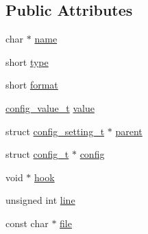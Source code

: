 \subsection*{Public Attributes}
\begin{DoxyCompactItemize}
\item 
char $\ast$ \hyperlink{structconfig__setting__t_a2228af4451498a4961b72dd4dcfe57cb}{name}
\item 
short \hyperlink{structconfig__setting__t_aab8065083de2436448b7b99b46feff18}{type}
\item 
short \hyperlink{structconfig__setting__t_a8957b2dcbf59fcfd00a3abe41bd0d7b5}{format}
\item 
\hyperlink{unionconfig__value__t}{config\_\-value\_\-t} \hyperlink{structconfig__setting__t_a2d217386c7e30456e484151b61ce597f}{value}
\item 
struct \hyperlink{structconfig__setting__t}{config\_\-setting\_\-t} $\ast$ \hyperlink{structconfig__setting__t_a70368ebbbb3c902adbbcd96606547d7d}{parent}
\item 
struct \hyperlink{structconfig__t}{config\_\-t} $\ast$ \hyperlink{structconfig__setting__t_a8d6d8450cc6e3485d9f2da3302c231f4}{config}
\item 
void $\ast$ \hyperlink{structconfig__setting__t_aa8238d7d2cc16b51eac47e82867494a5}{hook}
\item 
unsigned int \hyperlink{structconfig__setting__t_a11fc7f855c8200ea53458451d0ef0e9c}{line}
\item 
const char $\ast$ \hyperlink{structconfig__setting__t_af28d89c366212409e49f5dd52c9b7240}{file}
\end{DoxyCompactItemize}


